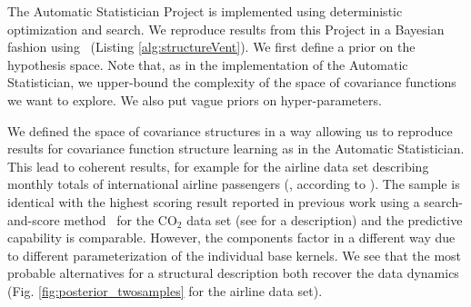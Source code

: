 The Automatic Statistician Project is implemented using deterministic optimization and search. We reproduce results from this Project in a Bayesian fashion using \gpmem\ (Listing \ref{alg:structureVent}). We first define a prior on the hypothesis space. Note that, as in the implementation of the Automatic Statistician, we upper-bound the complexity of the space of covariance functions we want to explore. We also put vague priors on hyper-parameters.






We defined the space of covariance structures in a way allowing us to reproduce results for covariance function structure learning as in the Automatic Statistician. This lead to coherent results, for example for the airline data set describing monthly totals of international airline passengers (\citealp{box2011time}, according to \citealp{duvenaud2013structure}). The sample is identical with the highest scoring result reported in previous work using a search-and-score method~\citep{duvenaud2013structure} for the CO$_2$ data set (see \citealp{rasmussen2006gaussian} for a description) and the predictive capability is comparable. However, the components factor in a different way due to different parameterization of the individual base kernels. We see that the most probable alternatives for a structural description both recover the data dynamics (Fig. \ref{fig:posterior_twosamples} for the airline data set).

